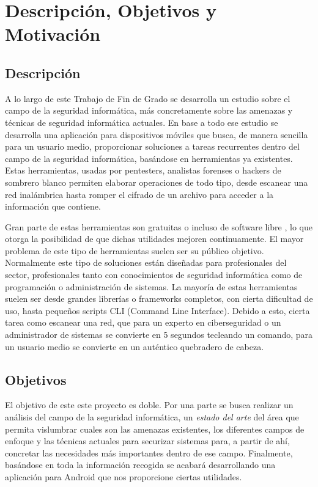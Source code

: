 \chapter{Descripción, Objetivos y Motivación}

\section{Descripción}

A lo largo de este Trabajo de Fin de Grado se desarrolla un estudio sobre el campo de la seguridad informática, más concretamente sobre las amenazas y técnicas de seguridad informática actuales. En base a todo ese estudio se desarrolla una aplicación para dispositivos móviles que busca, de manera sencilla para un usuario medio, proporcionar soluciones a tareas recurrentes dentro del campo de la seguridad informática, basándose en herramientas ya existentes. Estas herramientas, usadas por pentesters, analistas forenses o hackers de sombrero blanco permiten elaborar operaciones de todo tipo, desde escanear una red inalámbrica hasta romper el cifrado de un archivo para acceder a la información que contiene.

Gran parte de estas herramientas son gratuitas \cite{ofi-seg-inter} o incluso de software libre \cite{github-sec-showcase}, lo que otorga la posibilidad de que dichas utilidades mejoren continuamente. El mayor problema de este tipo de herramientas suelen ser su público objetivo. Normalmente este tipo de soluciones están diseñadas para profesionales del sector, profesionales tanto con conocimientos de seguridad informática como de programación o administración de sistemas. La mayoría de estas herramientas suelen ser desde grandes librerías o frameworks completos, con cierta dificultad de uso, hasta pequeños scripts CLI (Command Line Interface). Debido a esto, cierta tarea como escanear una red, que para un experto en ciberseguridad o un administrador de sistemas se convierte en 5 segundos tecleando un comando, para un usuario medio se convierte en un auténtico quebradero de cabeza.

\section{Objetivos}

El objetivo de este este proyecto es doble. Por una parte se busca realizar un análisis del campo de la seguridad informática, un \textit{estado del arte} del área que permita vislumbrar cuales son las amenazas existentes, los diferentes campos de enfoque y las técnicas actuales para securizar sistemas para, a partir de ahí, concretar las necesidades más importantes dentro de ese campo. Finalmente, basándose en toda la información recogida se acabará desarrollando una aplicación para Android que nos proporcione ciertas utilidades.

